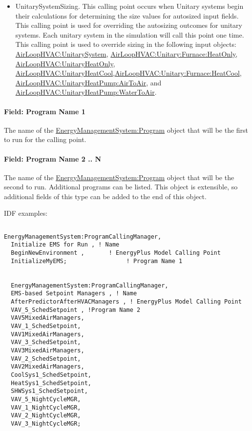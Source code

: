 \begin{itemize}
\item
  UnitarySystemSizing. This calling point occurs when Unitary systems begin their calculations for determining the size values for autosized input fields. This calling point is used for overriding the autosizing outcomes for unitary systems. Each unitary system in the simulation will call this point one time. This calling point is used to override sizing in the following input objects: \hyperref[airloophvacunitarysystem]{AirLoopHVAC:UnitarySystem}, \hyperref[airloophvacunitaryfurnaceheatonly]{AirLoopHVAC:Unitary:Furnace:HeatOnly}, \hyperref[airloophvacunitaryheatonly]{AirLoopHVAC:UnitaryHeatOnly}, \hyperref[airloophvacunitaryheatcool]{AirLoopHVAC:UnitaryHeatCool},\hyperref[airloophvacunitaryfurnaceheatcool]{AirLoopHVAC:Unitary:Furnace:HeatCool}, \hyperref[airloophvacunitaryheatpumpairtoair]{AirLoopHVAC:UnitaryHeatPump:AirToAir}, and \hyperref[airloophvacunitaryheatpumpwatertoair]{AirLoopHVAC:UnitaryHeatPump:WaterToAir}.
\end{itemize}

\paragraph{Field: Program Name 1}\label{field-program-name-1}

The name of the \hyperref[energymanagementsystemprogram]{EnergyManagementSystem:Program} object that will be the first to run for the calling point.

\paragraph{Field: Program Name 2 .. N}\label{field-program-name-2-..-n}

The name of the \hyperref[energymanagementsystemprogram]{EnergyManagementSystem:Program} object that will be the second to run. Additional programs can be listed. This object is extensible, so additional fields of this type can be added to the end of this object.

IDF examples:

\begin{lstlisting}

EnergyManagementSystem:ProgramCallingManager,
  Initialize EMS for Run , ! Name
  BeginNewEnvironment ,       ! EnergyPlus Model Calling Point
  InitializeMyEMS;                 ! Program Name 1


  EnergyManagementSystem:ProgramCallingManager,
  EMS-based Setpoint Managers , ! Name
  AfterPredictorAfterHVACManagers , ! EnergyPlus Model Calling Point
  VAV_5_SchedSetpoint , !Program Name 2
  VAV5MixedAirManagers,
  VAV_1_SchedSetpoint,
  VAV1MixedAirManagers,
  VAV_3_SchedSetpoint,
  VAV3MixedAirManagers,
  VAV_2_SchedSetpoint,
  VAV2MixedAirManagers,
  CoolSys1_SchedSetpoint,
  HeatSys1_SchedSetpoint,
  SHWSys1_SchedSetpoint,
  VAV_5_NightCycleMGR,
  VAV_1_NightCycleMGR,
  VAV_2_NightCycleMGR,
  VAV_3_NightCycleMGR;
\end{lstlisting}

